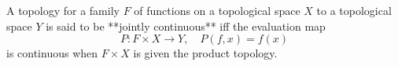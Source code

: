 A topology for a family $F$ of functions on a topological space $X$ to a topological space $Y$ is said to be **jointly continuous** iff the evaluation map
$$P : F \times X \to Y, \quad P(f, x) = f(x)$$
is continuous when $F \times X$ is given the product topology.

